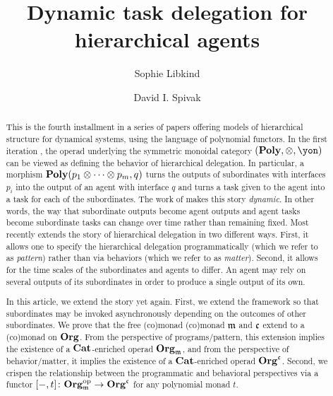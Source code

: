 \documentclass[11pt, one side, article]{memoir}
\begin{document}
\title{Dynamic task delegation for hierarchical agents}

\author{
	Sophie Libkind\and
	David I. Spivak
}


\maketitle

\begin{abstract}
This is the fourth installment in a series of papers offering models of hierarchical structure for dynamical systems, using the language of polynomial functors. In the first iteration  \cite{niu2022poly}, the operad underlying the symmetric monoidal category $(\poly, \otimes, \yon)$ can be viewed as defining the behavior of hierarchical delegation. In particular, a morphism $\mathbf{Poly}(p_1 \otimes \cdots \otimes p_m, q)$ turns the outputs of subordinates with interfaces $p_i$ into the output of an agent with interface $q$ and turns a task given to the agent into a task for each of the subordinates. The work of \cite{shapiro2022dynamic} makes this story \emph{dynamic}. In other words, the way that subordinate outputs become agent outputs and agent tasks become subordinate tasks can change over time rather than remaining fixed. Most recently \cite{libkind2024pattern}  extends the story of hierarchical delegation in two different ways. First, it allows one to specify the hierarchical delegation programmatically (which we refer to as \emph{pattern}) rather than via behaviors (which we refer to as \emph{matter}).  Second, it allows for the time scales of the subordinates and agents to differ. An agent may rely on several outputs of its subordinates in order to produce a single output of its own.

In this article, we extend the story yet again. First, we extend the framework so that subordinates may be invoked asynchronously depending on the outcomes of other subordinates. We prove that the free (co)monad (co)monad $\mathfrak{m}$ and $\mathfrak{c}$ extend to a (co)monad on $\mathbf{Org}$. From the perspective of programs/pattern, this extension implies the existence of a $\mathbf{Cat}$-enriched operad $\mathbf{Org}_{\mathfrak{m}}$, and from the perspective of behavior/matter, it implies the existence of a $\mathbf{Cat}$-enriched operad $\mathbf{Org}^{\mathfrak{c}}$.  Second, we crispen the relationship between the programmatic and behavioral perspectives via a functor $[-, t] \colon \mathbf{Org}_{\mathfrak{m}}^{\textnormal{op}} \to \mathbf{Org}^{\mathfrak{c}}$ for any polynomial monad $t$.

\end{abstract}
\end{document}
